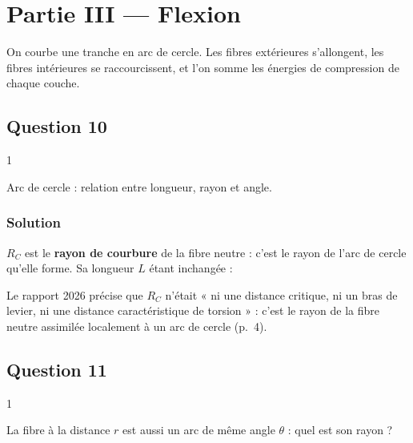 \documentclass[11pt,a4paper]{article}
\newcommand{\equationajustee}[1]{%
  \sbox{\boiteequation}{$\displaystyle #1$}%
  \ifdim\wd\boiteequation>\linewidth
    \[\resizebox{\linewidth}{!}{\usebox{\boiteequation}}\]%
  \else
    \[#1\]%
  \fi}
\begin{document}
\hypertarget{partie-iii-flexion}{%
\section{Partie III --- Flexion}\label{partie-iii-flexion}}

On courbe une tranche en arc de cercle. Les fibres extérieures s'allongent, les fibres intérieures se raccourcissent, et l'on somme les énergies de compression de chaque couche.

\hypertarget{question-10}{%
\subsection{Question 10}\label{question-10}}

\begin{indication}{1}

Arc de cercle : relation entre longueur, rayon et angle.

\end{indication}

\hypertarget{solution-9}{%
\subsubsection{Solution}\label{solution-9}}

\(R_C\) est le \textbf{rayon de courbure} de la fibre neutre : c'est le rayon de l'arc de cercle qu'elle forme. Sa longueur \(L\) étant inchangée :

\equationajustee{\boxed{L=R_C\,\theta}}

\begin{jury}

Le rapport 2026 précise que \(R_C\) n'était « ni une distance critique, ni un bras de levier, ni une distance caractéristique de torsion » : c'est le rayon de la fibre neutre assimilée localement à un arc de cercle (p.~4).

\end{jury}

\hypertarget{question-11}{%
\subsection{Question 11}\label{question-11}}

\begin{indication}{1}

La fibre à la distance \(r\) est aussi un arc de même angle \(\theta\) : quel est son rayon ?

\end{indication}
\end{document}

